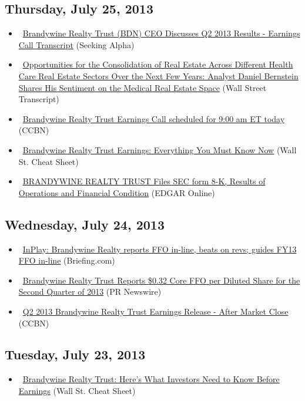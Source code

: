 \documentclass[11pt,asymmetric]{article}
\begin{document}
\subsection*{Thursday, July 25, 2013}
\begin{itemize}
\item\ \href{http://seekingalpha.com/article/1573012-brandywine-realty-trust-bdn-ceo-discusses-q2-2013-results-earnings-call-transcript?source=yahoo}{Brandywine Realty Trust (BDN) CEO Discusses Q2 2013 Results - Earnings Call Transcript} (Seeking Alpha)
\item\ \href{http://finance.yahoo.com/news/opportunities-consolidation-real-estate-across-201000017.html}{Opportunities for the Consolidation of Real Estate Across Different Health Care Real Estate Sectors Over the Next Few Years: Analyst Daniel Bernstein Shares His Sentiment on the Medical Real Estate Space} (Wall Street Transcript)
\item\ \href{http://biz.yahoo.com/cc/6/139036.html}{Brandywine Realty Trust Earnings Call scheduled for 9:00 am ET today} (CCBN)
\item\ \href{http://wallstcheatsheet.com/stocks/brandywine-realty-trust-earnings-everything-you-must-know-now-2.html/?ref=YF}{Brandywine Realty Trust Earnings: Everything You Must Know Now} (Wall St. Cheat Sheet)
\item\ \href{http://biz.yahoo.com/e/130725/bdn8-k.html}{BRANDYWINE REALTY TRUST Files SEC form 8-K, Results of Operations and Financial Condition} (EDGAR Online)
\end{itemize}
\subsection*{Wednesday, July 24, 2013}
\begin{itemize}
\item\ \href{http://finance.yahoo.com/mp#bdn}{InPlay: Brandywine Realty reports FFO in-line, beats on revs; guides FY13 FFO in-line} (Briefing.com)
\item\ \href{http://finance.yahoo.com/news/brandywine-realty-trust-reports-0-201500340.html}{Brandywine Realty Trust Reports \$0.32 Core FFO per Diluted Share for the Second Quarter of 2013} (PR Newswire)
\item\ \href{http://biz.yahoo.com/research/earncal/20130724.html?t=bdn}{Q2 2013 Brandywine Realty Trust Earnings Release - After Market Close} (CCBN)
\end{itemize}
\subsection*{Tuesday, July 23, 2013}
\begin{itemize}
\item\ \href{http://wallstcheatsheet.com/stocks/brandywine-realty-trust-heres-what-investors-need-to-know-before-earnings.html/?ref=YF}{Brandywine Realty Trust: Here’s What Investors Need to Know Before Earnings} (Wall St. Cheat Sheet)
\end{itemize}
\end{document}
